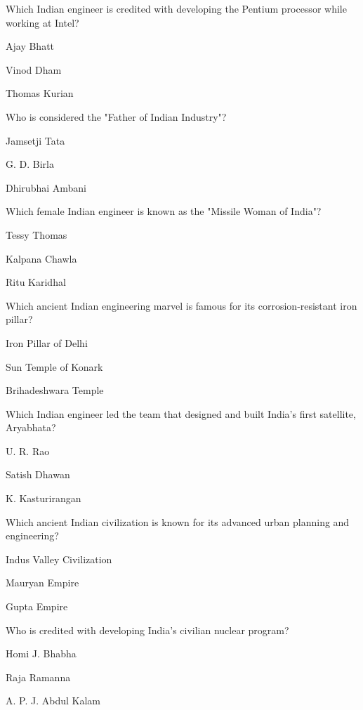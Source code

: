 \begin{enhancedmcq}{Which Indian engineer is credited with developing the Pentium processor while working at Intel?}
\item Ajay Bhatt
\item Vinod Dham
\item Thomas Kurian

\end{enhancedmcq}
\begin{enhancedmcq}{Who is considered the "Father of Indian Industry"?}
\item Jamsetji Tata
\item G. D. Birla
\item Dhirubhai Ambani

\end{enhancedmcq}
\begin{enhancedmcq}{Which female Indian engineer is known as the "Missile Woman of India"?}
\item Tessy Thomas
\item Kalpana Chawla
\item Ritu Karidhal

\end{enhancedmcq}
\begin{enhancedmcq}{Which ancient Indian engineering marvel is famous for its corrosion‑resistant iron pillar?}
\item Iron Pillar of Delhi
\item Sun Temple of Konark
\item Brihadeshwara Temple

\end{enhancedmcq}
\begin{enhancedmcq}{Which Indian engineer led the team that designed and built India's first satellite, Aryabhata?}
\item U. R. Rao
\item Satish Dhawan
\item K. Kasturirangan

\end{enhancedmcq}
\begin{enhancedmcq}{Which ancient Indian civilization is known for its advanced urban planning and engineering?}
\item Indus Valley Civilization
\item Mauryan Empire
\item Gupta Empire

\end{enhancedmcq}
\begin{enhancedmcq}{Who is credited with developing India's civilian nuclear program?}
\item Homi J. Bhabha
\item Raja Ramanna
\item A. P. J. Abdul Kalam

\end{enhancedmcq}
